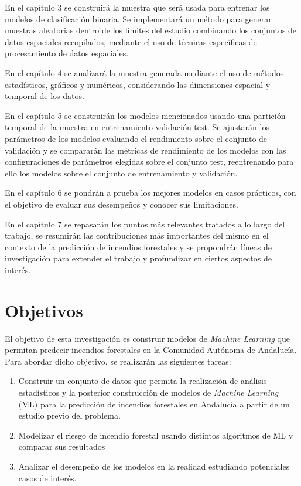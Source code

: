 \documentclass[12pt,a4paper,]{book}
\numberwithin{dummy}{section}
\theoremstyle{ocrenumbox}
\theoremstyle{blacknumex}
\theoremstyle{blacknumbox}
\theoremstyle{ocrenum}
\theoremstyle{ocrenum}
\begin{document}
En el capítulo 3 se construirá la muestra que será usada para entrenar
los modelos de clasificación binaria. Se implementará un método para
generar muestras aleatorias dentro de los límites del estudio combinando
los conjuntos de datos espaciales recopilados, mediante el uso de
técnicas específicas de procesamiento de datos espaciales.

En el capítulo 4 se analizará la muestra generada mediante el uso de
métodos estadísticos, gráficos y numéricos, considerando las dimensiones
espacial y temporal de los datos.

En el capítulo 5 se construirán los modelos mencionados usando una
partición temporal de la muestra en entrenamiento-validación-test. Se
ajustarán los parámetros de los modelos evaluando el rendimiento sobre
el conjunto de validación y se compararán las métricas de rendimiento de
los modelos con las configuraciones de parámetros elegidas sobre el
conjunto test, reentrenando para ello los modelos sobre el conjunto de
entrenamiento y validación.

En el capítulo 6 se pondrán a prueba los mejores modelos en casos
prácticos, con el objetivo de evaluar sus desempeños y conocer sus
limitaciones.

En el capítulo 7 se repasarán los puntos más relevantes tratados a lo
largo del trabajo, se resumirán las contribuciones más importantes del
mismo en el contexto de la predicción de incendios forestales y se
propondrán líneas de investigación para extender el trabajo y
profundizar en ciertos aspectos de interés.

\hypertarget{objetivos}{%
\section{Objetivos}\label{objetivos}}

El objetivo de esta investigación es construir modelos de \emph{Machine
Learning} que permitan predecir incendios forestales en la Comunidad
Autónoma de Andalucía. Para abordar dicho objetivo, se realizarán las
siguientes tareas:

\begin{enumerate}
\def\labelenumi{\arabic{enumi}.}
\item
  Construir un conjunto de datos que permita la realización de análisis
  estadísticos y la posterior construcción de modelos de \emph{Machine
  Learning} (ML) para la predicción de incendios forestales en Andalucía
  a partir de un estudio previo del problema.
\item
  Modelizar el riesgo de incendio forestal usando distintos algoritmos
  de ML y comparar sus resultados
\item
  Analizar el desempeño de los modelos en la realidad estudiando
  potenciales casos de interés.
\end{enumerate}




%
\end{document}
